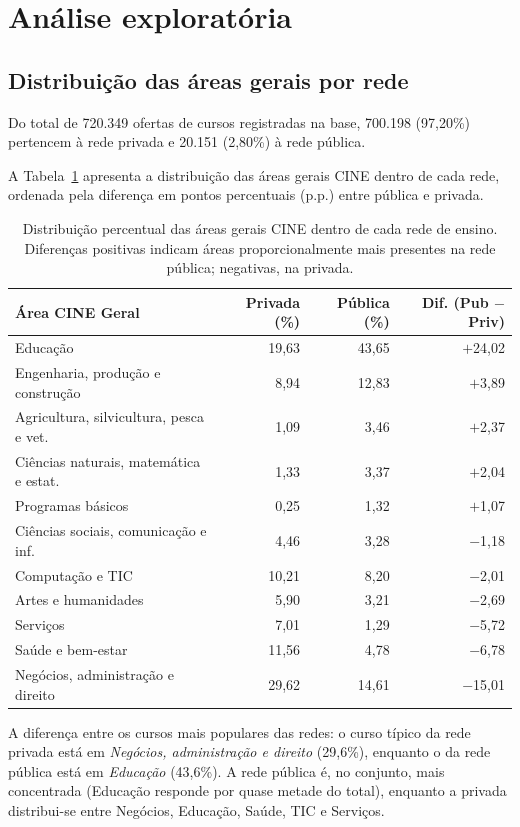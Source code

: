 \documentclass[12pt]{article}
\begin{document}
\section{Análise exploratória}


\subsection{Distribuição das áreas gerais por rede}

Do total de 720.349 ofertas de cursos registradas na base, 700.198 (97,20\%) pertencem à rede privada e 20.151 (2,80\%) à rede pública.

A Tabela~\ref{tab:area-rede} apresenta a distribuição das áreas gerais CINE dentro de cada rede, ordenada pela diferença em pontos percentuais (p.p.) entre pública e privada.

\begin{table}[h]
\centering
\small
\begin{tabular}{lrrr}
\toprule
Área CINE Geral & Privada (\%) & Pública (\%) & Dif. (Pub $-$ Priv) \\
\midrule
Educação & 19,63 & 43,65 & $+$24,02 \\
Engenharia, produção e construção & 8,94 & 12,83 & $+$3,89 \\
Agricultura, silvicultura, pesca e vet. & 1,09 & 3,46 & $+$2,37 \\
Ciências naturais, matemática e estat. & 1,33 & 3,37 & $+$2,04 \\
Programas básicos & 0,25 & 1,32 & $+$1,07 \\
Ciências sociais, comunicação e inf. & 4,46 & 3,28 & $-$1,18 \\
Computação e TIC & 10,21 & 8,20 & $-$2,01 \\
Artes e humanidades & 5,90 & 3,21 & $-$2,69 \\
Serviços & 7,01 & 1,29 & $-$5,72 \\
Saúde e bem-estar & 11,56 & 4,78 & $-$6,78 \\
Negócios, administração e direito & 29,62 & 14,61 & $-$15,01 \\
\bottomrule
\end{tabular}
\caption{Distribuição percentual das áreas gerais CINE dentro de cada rede de ensino. Diferenças positivas indicam áreas proporcionalmente mais presentes na rede pública; negativas, na privada.}
\label{tab:area-rede}
\end{table}

A diferença entre os cursos mais populares das redes: o curso típico da rede privada está em \textit{Negócios, administração e direito} (29,6\%), enquanto o da rede pública está em \textit{Educação} (43,6\%). A rede pública é, no conjunto, mais concentrada (Educação responde por quase metade do total), enquanto a privada distribui-se entre Negócios, Educação, Saúde, TIC e Serviços.
\end{document}
